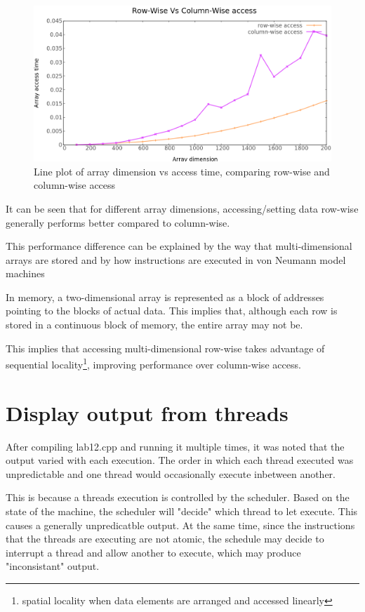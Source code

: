 \documentclass[12pt]{article}
\begin{document}
	
	\begin{figure}[H]
		\centering
		\begin{center}
			\includegraphics[width=1.00\textwidth]{line-point2.png}
		\end{center}		
		\caption{Line plot of array dimension vs access time, comparing row-wise and column-wise access}
	\end{figure}

	It can be seen that for different array dimensions, accessing/setting data row-wise generally performs better compared to column-wise. \\ \par
	This performance difference can be explained by the way that multi-dimensional arrays are stored and by how instructions are executed in von Neumann model machines \\ \par
	In memory, a two-dimensional array is represented as a block of addresses pointing to the blocks of actual data. This implies that, although each row is stored in a continuous block of memory, the entire array may not be. \\ \par
	This implies that accessing multi-dimensional row-wise takes advantage of sequential locality\footnote{spatial locality when data elements are arranged and accessed linearly}, improving performance over column-wise access.
	\pagebreak
	
	\section{Display output from threads}
	
	After compiling lab12.cpp and running it multiple times, it was noted that the output varied with each execution. The order in which each thread executed was unpredictable and one thread would occasionally execute inbetween another. \\ \par
	This is because a threads execution is controlled by the scheduler. Based on the state of the machine, the scheduler will "decide" which thread to let execute. This causes a generally unpredicatble output. At the same time, since the instructions that the threads are executing are not atomic, the schedule may decide to interrupt a thread and allow another to execute, which may produce "inconsistant" output.
\end{document}
